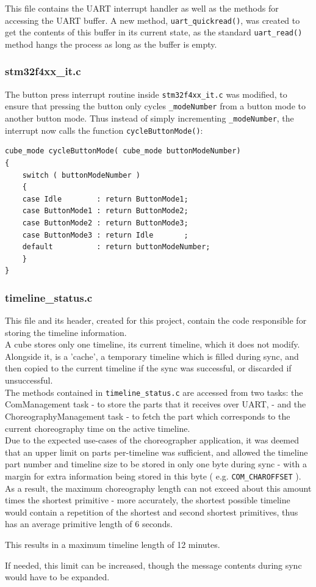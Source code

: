 This file contains the UART interrupt handler as well as the methods for accessing the UART buffer. A new method, \texttt{uart\_quickread()}, was created to get the contents of this buffer in its current state, as the standard \texttt{uart\_read()} method hangs the process as long as the buffer is empty.

\subsubsection{stm32f4xx\_it.c}

The button press interrupt routine inside \texttt{stm32f4xx\_it.c} was modified, to ensure that pressing the button only cycles \texttt{\_modeNumber} from a button mode to another button mode. Thus instead of simply incrementing \texttt{\_modeNumber}, the interrupt now calls the function \texttt{cycleButtonMode()}:

\lstset{language=C,numbers=none}
\begin{lstlisting}[frame=lines]
cube_mode cycleButtonMode( cube_mode buttonModeNumber)
{
	switch ( buttonModeNumber )
	{
	case Idle		 : return ButtonMode1;
	case ButtonMode1 : return ButtonMode2;
	case ButtonMode2 : return ButtonMode3;
	case ButtonMode3 : return Idle       ;
	default 		 : return buttonModeNumber;
	}
}
\end{lstlisting}


\subsubsection{timeline\_status.c}

This file and its header, created for this project, contain the code responsible for storing the timeline information.\\

A cube stores only one timeline, its current timeline, which it does not modify. Alongside it, is a 'cache', a temporary timeline which is filled during sync, and then copied to the current timeline if the sync was successful, or discarded if unsuccessful.\\

The methods contained in \texttt{timeline\_status.c} are accessed from two tasks: the ComManagement task - to store the parts that it receives over UART, - and the ChoreographyManagement task - to fetch the part which corresponds to the current choreography time on the active timeline.\\

Due to the expected use-cases of the choreographer application, it was deemed that an upper limit on parts per-timeline was sufficient, and allowed the timeline part number and timeline size to be stored in only one byte during sync - with a margin for extra information being stored in this byte ( e.g. \texttt{COM\_CHAROFFSET} ). As a result, the maximum choreography length can not exceed about this amount times the shortest primitive - more accurately, the shortest possible timeline would contain a repetition of the shortest and second shortest primitives, thus has an average primitive length of 6 seconds. 

This results in a maximum timeline length of 12 minutes. 

If needed, this limit can be increased, though the message contents during sync would have to be expanded.
